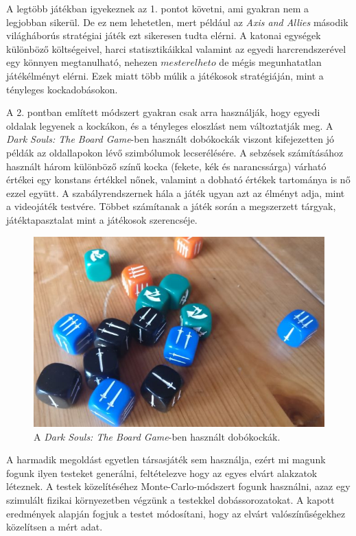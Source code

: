 A legtöbb játékban igyekeznek az 1. pontot követni, ami gyakran nem a legjobban sikerül.
De ez nem lehetetlen, mert például az \textit{Axis and Allies}\cite{axisnallies} második világháborús stratégiai játék ezt sikeresen tudta elérni.
A katonai egységek különböző költségeivel, harci statisztikáikkal valamint az egyedi harcrendszerével egy könnyen megtanulható, nehezen $mesterelheto$ de mégis megunhatatlan játékélményt elérni.
Ezek miatt több múlik a játékosok stratégiáján, mint a tényleges kockadobásokon.

A 2. pontban említett módszert gyakran csak arra használják, hogy egyedi oldalak legyenek a kockákon, és a tényleges eloszlást nem változtatják meg.
A \textit{Dark Souls: The Board Game}-ben \cite{darksouls} használt dobókockák viszont kifejezetten jó példák az oldallapokon lévő szimbólumok lecserélésére.
A sebzések számításához használt három különböző színű kocka (fekete, kék és narancssárga) várható értékei egy konstans értékkel nőnek, valamint a dobható értékek tartománya is nő ezzel együtt.
A szabályrendszernek hála a játék ugyan azt az élményt adja, mint a videojáték testvére.
Többet számítanak a játék során a megszerzett tárgyak, játéktapasztalat mint a játékosok szerencséje.

\begin{figure}[h!]
	\centering
	\includegraphics[scale=0.6]{images/dsdice.png}
	\caption{A \textit{Dark Souls: The Board Game}-ben használt dobókockák.}
	\label{fig:dsdice}
\end{figure}

A harmadik megoldást egyetlen társasjáték sem használja, ezért mi magunk fogunk ilyen testeket generálni, feltételezve hogy az egyes elvárt alakzatok léteznek.
A testek közelítéséhez Monte-Carlo-módszert fogunk használni, azaz egy szimulált fizikai környezetben végzünk a testekkel dobássorozatokat.
A kapott eredmények alapján fogjuk a testet módosítani, hogy az elvárt valószínűségekhez közelítsen a mért adat.
